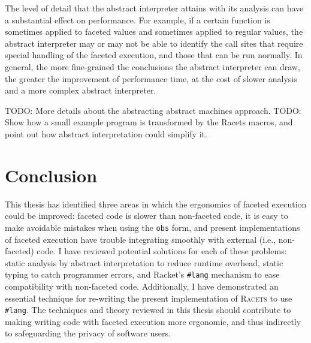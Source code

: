 \documentclass{article}
\begin{document}
The level of detail that the abstract interpreter attains with its analysis can have a substantial effect on performance. For example, if a certain function is sometimes applied to faceted values and sometimes applied to regular values, the abstract interpreter may or may not be able to identify the call sites that require special handling of the faceted execution, and those that can be run normally. In general, the more fine-grained the conclusions the abstract interpreter can draw, the greater the improvement of performance time, at the cost of slower analysis and a more complex abstract interpreter.

TODO: More details about the abstracting abstract machines approach.
TODO: Show how a small example program is transformed by the Racets macros, and point out how abstract interpretation could simplify it.



\section{Conclusion}
This thesis has identified three areas in which the ergonomics of faceted execution could be improved: faceted code is slower than non-faceted code, it is easy to make avoidable mistakes when using the \texttt{obs} form, and present implementations of faceted execution have trouble integrating smoothly with external (i.e., non-faceted) code. I have reviewed potential solutions for each of these problems: static analysis by abstract interpretation to reduce runtime overhead, static typing to catch programmer errors, and Racket's \texttt{\#lang} mechanism to ease compatibility with non-faceted code. Additionally, I have demonstrated an essential technique for re-writing the present implementation of \textsc{Racets} to use \texttt{\#lang}. The techniques and theory reviewed in this thesis should contribute to making writing code with faceted execution more ergonomic, and thus indirectly to safeguarding the privacy of software users.


\end{document}
